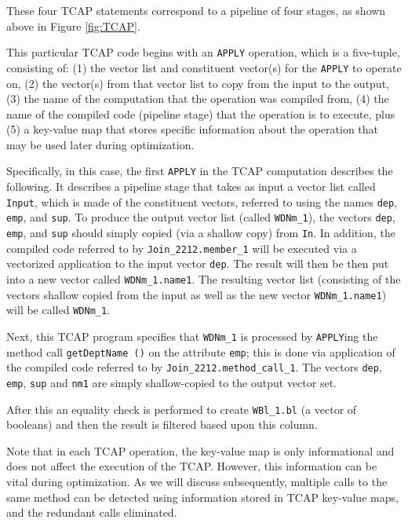 \noindent
These four TCAP statements correspond to a pipeline of four stages,
as shown above in Figure \ref{fig:TCAP}.

This particular TCAP code begins with an \texttt{APPLY} operation, which is a five-tuple, consisting of: (1) the vector list and constituent
vector(s) for the \texttt{APPLY} to operate on, (2) the vector(s) from that vector list to copy
from the input to the output, (3) the name of the computation that the operation was compiled from, (4) the name of the compiled code (pipeline stage)
that the operation is to execute, plus (5) a key-value map that stores specific information about the operation that may be used 
later during optimization.

Specifically, in this case, the first \texttt{APPLY} in the TCAP computation describes the following.  It describes a pipeline stage that
takes as input 
a vector list called \texttt{Input}, which is made of the constituent vectors, referred to using 
the names \texttt{dep}, \texttt{emp}, and \texttt{sup}.
To produce the output vector list (called \texttt{WDNm\_1}), the vectors
\texttt{dep}, \texttt{emp}, and \texttt{sup} should simply copied (via a shallow copy) from \texttt{In}.
In addition, the compiled code referred to by \texttt{Join\_2212.member\_1} will be executed via a vectorized application to the input
vector \texttt{dep}.  The result will then be then put into a new vector called 
\texttt{WDNm\_1.name1}.
The resulting vector list (consisting of the vectors shallow copied from the input as well as the new vector \texttt{WDNm\_1.name1})
will be called \texttt{WDNm\_1}.  

Next, this TCAP program
specifies that \texttt{WDNm\_1} is processed by \texttt{APPLY}ing the method call \texttt{getDeptName ()} on the attribute \texttt{emp}; this is 
done via application of the compiled code referred to by \texttt{Join\_2212.method\_call\_1}.  The vectors \texttt{dep}, \texttt{emp}, \texttt{sup}
and \texttt{nm1} are simply shallow-copied to the output vector set.

After this an equality check is performed to create \texttt{WBl\_1.bl} (a vector of booleans) and then the result is filtered based upon this column.

Note that in each TCAP operation, the key-value map is only informational and does not affect the execution of the TCAP.  However, this
information can be vital during optimization.  As we will discuss subsequently, 
multiple calls to the same method can be detected using information stored in TCAP key-value maps, and the redundant calls eliminated.

